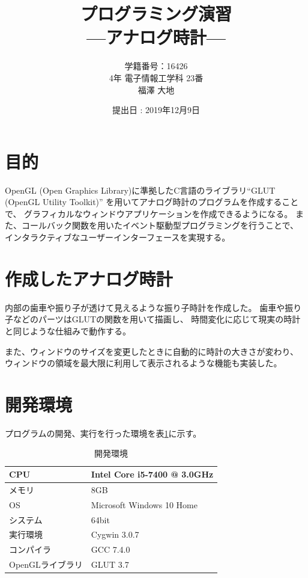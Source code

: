 \documentclass[a4j,titlepage]{jsarticle}
\begin{document}
\begin{titlepage}
  \title{\huge{プログラミング演習} \\ \LARGE{---アナログ時計---}}
	\author{学籍番号：16426 \\ 4年 電子情報工学科 23番 \\ 福澤 大地}
	\date{提出日 : 2019年12月9日}
  \maketitle
\end{titlepage}


\section{目的}
OpenGL (Open Graphics Library)に準拠したC言語のライブラリ``GLUT (OpenGL Utility Toolkit)''
を用いてアナログ時計のプログラムを作成することで、
グラフィカルなウィンドウアプリケーションを作成できるようになる。
また、コールバック関数を用いたイベント駆動型プログラミングを行うことで、
インタラクティブなユーザーインターフェースを実現する。


\section{作成したアナログ時計}
内部の歯車や振り子が透けて見えるような振り子時計を作成した。
歯車や振り子などのパーツはGLUTの関数を用いて描画し、
時間変化に応じて現実の時計と同じような仕組みで動作する。

また、ウィンドウのサイズを変更したときに自動的に時計の大きさが変わり、
ウィンドウの領域を最大限に利用して表示されるような機能も実装した。


\section{開発環境}
プログラムの開発、実行を行った環境を表\ref{tb:kan}に示す。

\begin{table}[H]
  \centering
  \caption{開発環境}
  \label{tb:kan}

  \begin{tabular}{|l|l|}
    \hline
    CPU & Intel Core i5-7400 @ 3.0GHz \\ \hline
    メモリ & 8GB \\ \hline
    OS & Microsoft Windows 10 Home \\ \hline
    システム & 64bit \\ \hline
    実行環境 & Cygwin 3.0.7 \\ \hline
    コンパイラ & GCC 7.4.0 \\ \hline
    OpenGLライブラリ & GLUT 3.7 \\ \hline
  \end{tabular}
\end{table}
\end{document}
